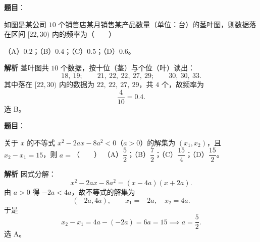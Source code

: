 \begin{answer}

\textbf{题目}：

如图是某公司 $10$ 个销售店某月销售某产品数量（单位：台）的茎叶图，则数据落在区间 $[22,30)$ 内的频率为\mbox{（　　）}
\nopagebreak[4]
\begin{center}\end{center}
\nopagebreak[4]
（A）$0.2$；（B）$0.4$；（C）$0.5$；（D）$0.6$。

\textbf{解析}
茎叶图共 $10$ 个数据，按十位（茎）与个位（叶）读出：
\nopagebreak[4]
\[18,\ 19;\qquad 21,\ 22,\ 22,\ 27,\ 29;\qquad 30,\ 30,\ 33.\]
其中落在 $[22,30)$ 内的数据为 $22,\ 22,\ 27,\ 29$，共 $4$ 个，故频率为
\nopagebreak[4]
\[\frac4{10}=0.4.\]
选 B。


\end{answer}
\begin{answer}

\textbf{题目}：

关于 $x$ 的不等式 $x^2-2ax-8a^2<0$（$a>0$）的解集为 $(x_1,x_2)$，且 $x_2-x_1=15$，则 $a=$\mbox{（　　）}
（A）$\dfrac52$；（B）$\dfrac72$；（C）$\dfrac{15}4$；（D）$\dfrac{15}2$。

\textbf{解析}
因式分解：
\nopagebreak[4]
\[x^2-2ax-8a^2=(x-4a)(x+2a).\]
由 $a>0$ 得 $-2a<4a$，故不等式的解集为
\nopagebreak[4]
\[(-2a,4a),\qquad x_1=-2a,\quad x_2=4a.\]
于是
\nopagebreak[4]
\[x_2-x_1=4a-(-2a)=6a=15\implies a=\frac52.\]
选 A。


\end{answer}
